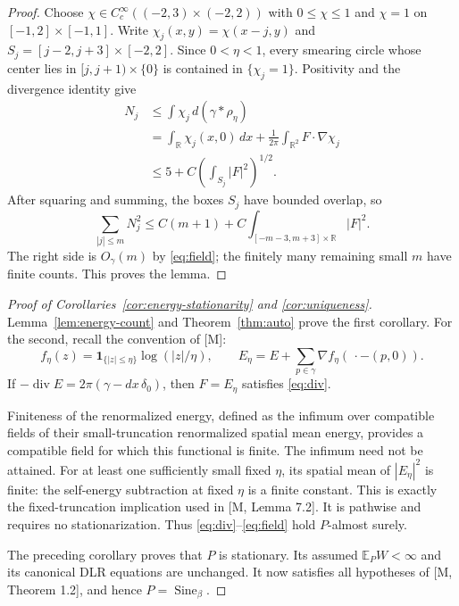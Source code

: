 \documentclass[11pt,reqno]{amsart}
\numberwithin{equation}{section}
\theoremstyle{definition}
\theoremstyle{remark}
\newcommand{\R}{\mathbb R}
\newcommand{\E}{\mathbb E}
\newcommand{\1}{\mathbf1}
\newcommand{\Sine}{\operatorname{Sine}}
\newcommand{\dd}{\,d}
\DeclareMathOperator{\diver}{div}
\begin{document}
\begin{proof}
Choose $\chi\in C_c^\infty((-2,3)\times(-2,2))$ with
$0\le\chi\le1$ and $\chi=1$ on $[-1,2]\times[-1,1]$.
Write $\chi_j(x,y)=\chi(x-j,y)$ and
$S_j=[j-2,j+3]\times[-2,2]$. Since $0<\eta<1$, every smearing circle
whose center lies in $[j,j+1)\times\{0\}$ is contained in
$\{\chi_j=1\}$. Positivity and the divergence identity give
\begin{align*}
N_j&\le\int\chi_j\dd(\gamma*\rho_\eta)\\
&=\int_\R\chi_j(x,0)\dd x
  +\frac1{2\pi}\int_{\R^2}F\cdot\nabla\chi_j\\
&\le5+C\left(\int_{S_j}|F|^2\right)^{1/2}.
\end{align*}
After squaring and summing, the boxes $S_j$ have bounded overlap, so
\begin{equation}\label{eq:count-field}
\sum_{|j|\le m}N_j^2
\le C(m+1)+C\int_{[-m-3,m+3]\times\R}|F|^2.
\end{equation}
The right side is $O_\gamma(m)$ by \eqref{eq:field}; the finitely
many remaining small $m$ have finite counts. This proves the lemma.
\end{proof}

\begin{proof}[Proof of Corollaries~\ref{cor:energy-stationarity}
and \ref{cor:uniqueness}]
Lemma~\ref{lem:energy-count} and Theorem~\ref{thm:auto} prove the
first corollary. For the second, recall the convention of [M]:
\[
f_\eta(z)=\1_{\{|z|\le\eta\}}\log(|z|/\eta),\qquad
E_\eta=E+\sum_{p\in\gamma}\nabla f_\eta(\,\cdot-(p,0)).
\]
If $-\diver E=2\pi(\gamma-dx\,\delta_0)$, then $F=E_\eta$
satisfies \eqref{eq:div}.

Finiteness of the renormalized energy, defined as the infimum over
compatible fields of their small-truncation renormalized spatial mean
energy, provides a compatible field for which this functional is
finite. The infimum need not be attained. For at least one sufficiently
small fixed $\eta$, its spatial mean of $|E_\eta|^2$ is finite:
the self-energy subtraction at fixed $\eta$ is a finite constant.
This is exactly the fixed-truncation implication used in
[M, Lemma 7.2]. It is pathwise and requires no stationarization.
Thus \eqref{eq:div}--\eqref{eq:field} hold $P$-almost surely.

The preceding corollary proves that $P$ is stationary. Its assumed
$\E_PW<\infty$ and its canonical DLR equations are unchanged.
It now satisfies all hypotheses of [M, Theorem 1.2], and hence
$P=\Sine_\beta$.
\end{proof}
\end{document}
